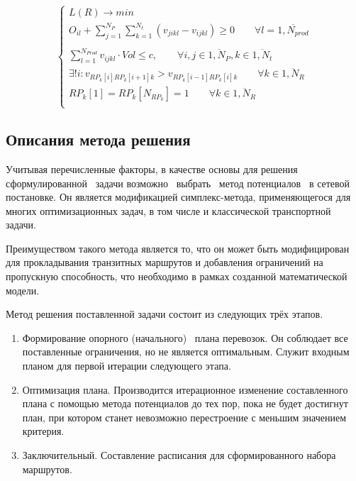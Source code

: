 	\begin{equation}
	\left\{ \begin{array}{ccc}	
		L(R) \to min \\
		O_{il} + \sum_{j=1}^{N_P} \sum_{k=1}^{N_t} (v_{jikl} - v_{ijkl}) \ge 0 \qquad  \forall l = \overline{1, N_{prod}} \\
		\\
		\sum_{l=1}^{N_{Prod}} v_{ijkl} \cdot Vol \le c, \qquad \forall i, j \in \overline{1, N_P}, k \in \overline{1, N_t} \\
		\exists! i: v_{RP_k[i]RP_k[i+1]k} > v_{RP_k[i-1]RP_k[i]k} \qquad \forall k \in \overline{1, N_R} \\
		RP_k[1] = RP_k[N_{RP_k}] = 1 \qquad \forall k \in \overline{1, N_R}\\
		
	\end{array}	\right.
	\end{equation}

\subsection{Описания метода решения}
	Учитывая перечисленные факторы, в качестве основы для решения сформулированной \, задачи возможно \, выбрать \, метод потенциалов \, в сетевой \, постановке\cite{trans:polycrit}. Он является модификацией симплекс-метода, применяющегося для многих оптимизационных задач, в том числе и классической транспортной задачи\cite{trans:potential}.
		
	Преимуществом такого метода является то, что он может быть модифицирован для прокладывания транзитных маршрутов и добавления ограничений на пропускную способность, что необходимо в рамках созданной математической модели.
	
	Метод решения поставленной задачи состоит из следующих трёх этапов.
	\begin{enumerate}
		\item Формирование опорного (начального) \, плана перевозок. Он соблюдает все поставленные ограничения, но не является оптимальным. Служит входным планом для первой итерации следующего этапа.
		\item Оптимизация плана. Производится итерационное изменение составленного плана с помощью метода потенциалов до тех пор, пока не будет достигнут план, при котором станет невозможно перестроение с меньшим значением критерия.
		\item Заключительный. Составление расписания для сформированного набора маршрутов.
	\end{enumerate} 

